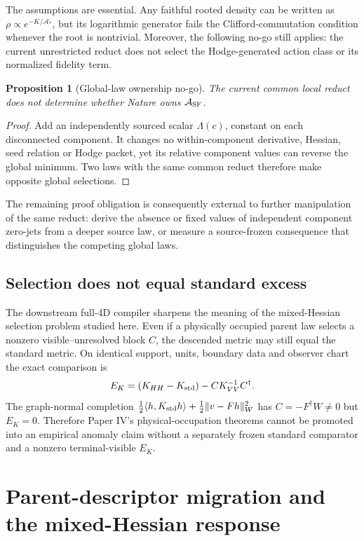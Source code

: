 \documentclass[11pt]{article}
\newtheorem{proposition}{Proposition}
\begin{document}
The assumptions are essential.  Any faithful rooted density can be written
as \(\rho\propto e^{-K/\mathcal A_*}\), but its logarithmic generator fails
the Clifford-commutation condition whenever the root is nontrivial.  Moreover,
the following no-go still applies: the current unrestricted reduct does not
select the Hodge-generated action class or its normalized fidelity term.

\begin{proposition}[Global-law ownership no-go]
The current common local reduct does not determine whether Nature owns
\(\mathcal A_{\rm SF}\).
\end{proposition}

\begin{proof}
Add an independently sourced scalar \(\Lambda(c)\), constant on each
disconnected component.  It changes no within-component derivative, Hessian,
seed relation or Hodge packet, yet its relative component values can reverse
the global minimum.  Two laws with the same common reduct therefore make
opposite global selections.
\end{proof}

The remaining proof obligation is consequently external to further
manipulation of the same reduct: derive the absence or fixed values of
independent component zero-jets from a deeper source law, or measure a
source-frozen consequence that distinguishes the competing global laws.

\subsection{Selection does not equal standard excess}

The downstream full-4D compiler sharpens the meaning of the mixed-Hessian
selection problem studied here.  Even if a physically occupied parent law
selects a nonzero visible--unresolved block \(C\), the descended metric may
still equal the standard metric.  On identical support, units, boundary data
and observer chart the exact comparison is
\[
 E_K=(K_{HH}-K_{\rm std})-CK_{VV}^{-1}C^\dagger .
\]
The graph-normal completion \(\frac12\langle h,K_{\rm std}h\rangle+
\frac12\|v-Fh\|_W^2\) has \(C=-F^\dagger W\neq0\) but \(E_K=0\).
Therefore Paper IV's physical-occupation theorems cannot be promoted into an
empirical anomaly claim without a separately frozen standard comparator and a
nonzero terminal-visible \(E_K\).

\section{Parent-descriptor migration and the mixed-Hessian response}
\end{document}
